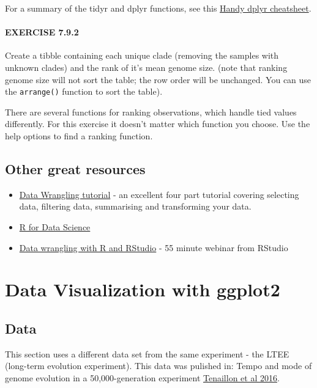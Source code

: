 \documentclass[
]{book}
\providecommand{\tightlist}{%
  \setlength{\itemsep}{0pt}\setlength{\parskip}{0pt}}
\begin{document}
For a summary of the tidyr and dplyr functions, see this \href{http://www.rstudio.com/wp-content/uploads/2015/02/data-wrangling-cheatsheet.pdf}{Handy dplyr cheatsheet}.

\subsubsection*{EXERCISE 7.9.2}\label{exercise-7.9.2}

Create a tibble containing each unique clade (removing the samples with unknown clades) and the rank of it's mean genome size. (note that ranking genome size will not sort the table; the row order will be unchanged. You can use the \texttt{arrange()} function to sort the table).

There are several functions for ranking observations, which handle tied values differently. For this exercise it doesn't matter which function you choose. Use the help options to find a ranking function.

\section{Other great resources}\label{other-great-resources}

\begin{itemize}
\tightlist
\item
  \href{https://suzan.rbind.io/categories/tutorial/}{Data Wrangling tutorial} - an excellent four part tutorial covering selecting data, filtering data, summarising and transforming your data.
\item
  \href{http://r4ds.had.co.nz/}{R for Data Science}
\item
  \href{https://www.rstudio.com/resources/webinars/data-wrangling-with-r-and-rstudio/}{Data wrangling with R and RStudio} - 55 minute webinar from RStudio
\end{itemize}

\chapter{Data Visualization with ggplot2}\label{data-visualization-with-ggplot2}

\section{Data}\label{data}

This section uses a different data set from the same experiment - the LTEE (long-term evolution experiment). This data was pulished in: Tempo and mode of genome evolution in a 50,000-generation experiment \href{https://www.ncbi.nlm.nih.gov/pmc/articles/PMC4988878/}{Tenaillon et al 2016}.
\end{document}
